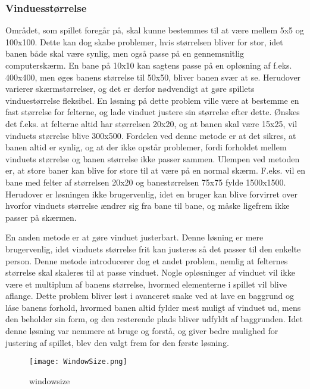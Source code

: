 \subsubsection{Vinduesstørrelse}
Området, som spillet foregår på, skal kunne bestemmes til at være mellem 5x5 og 100x100. Dette kan dog skabe problemer, hvis størrelsen bliver for stor, idet banen både skal være synlig, men også passe på en gennemsnitlig computerskærm. En bane på 10x10 kan sagtens passe på en opløsning af f.eks. 400x400, men øges banens størrelse til 50x50, bliver banen svær at se. Herudover varierer skærmstørrelser, og det er derfor nødvendigt at gøre spillets vinduestørrelse fleksibel. En løsning på dette problem ville være at bestemme en fast størrelse for felterne, og lade vinduet justere sin størrelse efter dette. Ønskes det f.eks. at felterne altid har størrelsen 20x20, og at banen skal være 15x25, vil vinduets størrelse blive 300x500. Fordelen ved denne metode er at det sikres, at banen altid er synlig, og at der ikke opstår problemer, fordi forholdet mellem vinduets størrelse og banen størrelse ikke passer sammen. Ulempen ved metoden er, at store baner kan blive for store til at være på en normal skærm. F.eks. vil en bane med felter af størrelsen 20x20 og banestørrelsen 75x75 fylde 1500x1500. Herudover er løsningen ikke brugervenlig, idet en bruger kan blive forvirret over hvorfor vinduets størrelse ændrer sig fra bane til bane, og måske ligefrem ikke passer på skærmen.

En anden metode er at gøre vinduet justerbart. Denne løsning er mere brugervenlig, idet vinduets størrelse frit kan justeres så det passer til den enkelte person. Denne metode introducerer dog et andet problem, nemlig at felternes størrelse skal skaleres til at passe vinduet. Nogle opløsninger af vinduet vil ikke være et multiplum af banens størrelse, hvormed elementerne i spillet vil blive aflange. Dette problem bliver løst i avanceret snake ved at lave en baggrund og låse banens forhold, hvormed banen altid fylder mest muligt af vinduet ud, mens den beholder sin form, og den resterende plads bliver udfyldt af baggrunden. Idet denne løsning var nemmere at bruge og forstå, og giver bedre mulighed for justering af spillet, blev den valgt frem for den første løsning.
\begin{figure}[h]
	\centering
	\graphicspath{ {pics/} }
	\texttt{[image: WindowSize.png]}
	\label{fig:windowsize}
	\caption{windowsize}
\end{figure}